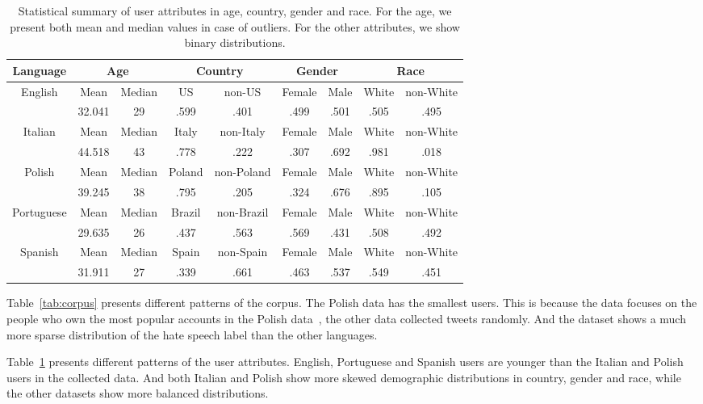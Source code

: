 \begin{table}[htp]
\centering
\begin{tabular}{c||cc|cc|cc|cc}
Language & \multicolumn{2}{c|}{Age} & \multicolumn{2}{c|}{Country} & \multicolumn{2}{c|}{Gender} & \multicolumn{2}{c}{Race} \\\hline\hline
\multirow{2}{*}{English} & Mean & Median & US & non-US & Female & Male & White & non-White \\
 & 32.041 & 29 & .599 & .401 & .499 & .501 & .505 & .495 \\\hline
\multirow{2}{*}{Italian} & Mean & Median & Italy & non-Italy & Female & Male & White & non-White \\
 & 44.518 & 43 & .778 & .222 & .307 & .692 & .981 & .018 \\\hline
\multirow{2}{*}{Polish} & Mean & Median & Poland & non-Poland & Female & Male & White & non-White \\
 & 39.245 & 38 & .795 & .205 & .324 & .676 & .895 & .105 \\\hline
\multirow{2}{*}{Portuguese} & Mean & Median & Brazil & non-Brazil & Female & Male & White & non-White \\
 & 29.635 & 26 & .437 & .563 & .569 & .431 & .508 & .492 \\\hline
\multirow{2}{*}{Spanish} & Mean & Median & Spain & non-Spain & Female & Male & White & non-White \\
 & 31.911 & 27 & .339 & .661 & .463 & .537 & .549 & .451
\end{tabular}
\caption{Statistical summary of user attributes in age, country, gender and race. For the age, we present both mean and median values in case of outliers. For the other attributes, we show binary distributions.}
\label{tab:user}
\end{table}

Table~\ref{tab:corpus} presents different patterns of the corpus. 
The Polish data has the smallest users. 
This is because the data focuses on the people who own the most popular accounts in the Polish data~\cite{ptaszynski2017learning}, the other data collected tweets randomly.
And the dataset shows a much more sparse distribution of the hate speech label than the other languages.

Table~\ref{tab:user} presents different patterns of the user attributes. 
English, Portuguese and Spanish users are younger than the Italian and Polish users in the collected data.
And both Italian and Polish show more skewed demographic distributions in country, gender and race, while the other datasets show more balanced distributions.

